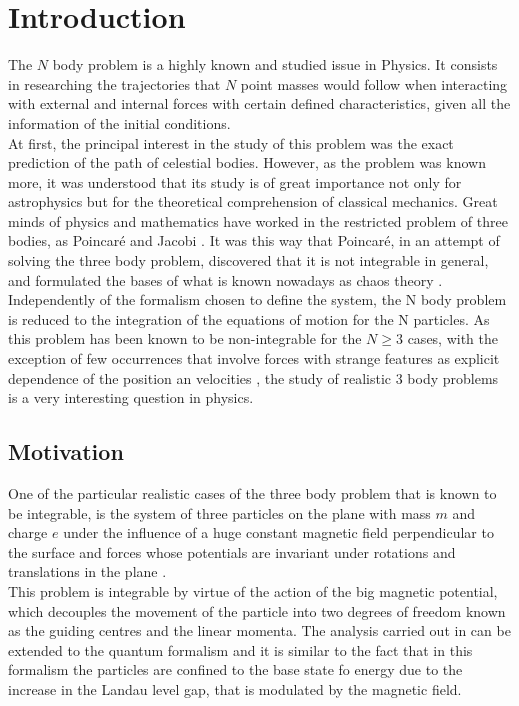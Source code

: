\chapter{Introduction}
The $N$ body problem is a highly known and studied issue in Physics. It consists in researching the trajectories that $N$ point masses would follow when interacting with external and internal forces with certain defined characteristics, given all the information of the initial conditions.\\

At first, the principal interest in the study of this problem was the exact prediction of the path of celestial bodies. However, as the problem was known more, it was understood that its study is of great importance not only for astrophysics but for the theoretical comprehension of classical mechanics. Great minds of physics and mathematics have worked in the restricted problem of three bodies, as Poincar\'e \cite{introPoincare} and Jacobi \cite{introJacobi}. It was this way that Poincar\'e, in an attempt of solving the three body problem, discovered that it is not integrable in general, and formulated the bases of what is known nowadays as chaos theory \cite{introPoincare}.\\

Independently of the formalism chosen to define the system, the N body problem is reduced to the integration of the equations of motion for the N particles. As this problem has been known to be non-integrable for the $N\geq 3$ cases, with the exception of few occurrences that involve forces with strange features as explicit dependence of the position an velocities \cite{strangeCases}, the study of realistic 3 body problems is a very interesting question in physics.\\

\section{Motivation}
One of the particular realistic cases of the three body problem that is known to be integrable, is the system of three particles on the plane with mass $m$ and charge $e$ under the influence of a huge constant magnetic field perpendicular to the surface and forces whose potentials are invariant under rotations and translations in the plane \cite{alonso}.\\

This problem is integrable by virtue of the action of the big magnetic potential, which decouples the movement of  the particle into two degrees of freedom known as the guiding centres and the linear momenta. The analysis carried out in \cite{alonso} can be extended to the quantum formalism and it is similar to the fact that in this formalism the particles are confined to the base state fo energy due to the increase in the Landau level gap, that is modulated by the magnetic field.\\

